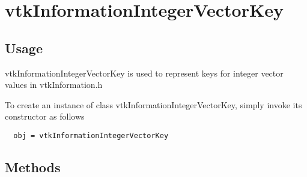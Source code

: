 \section{vtkInformationIntegerVectorKey}

\subsection{Usage}

 vtkInformationIntegerVectorKey is used to represent keys for integer
 vector values in vtkInformation.h

To create an instance of class vtkInformationIntegerVectorKey, simply
invoke its constructor as follows
\begin{verbatim}
  obj = vtkInformationIntegerVectorKey
\end{verbatim}
\subsection{Methods}

